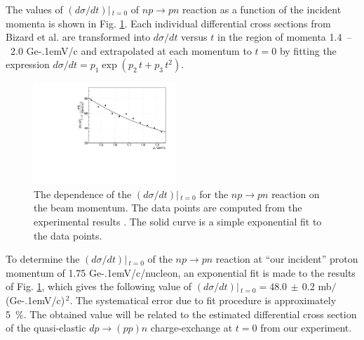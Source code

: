 \documentclass[twocolumn,epjc3]{svjour3}
\newcommand{\np}     {\ensuremath{np \rightarrow pn}\xspace}
\newcommand{\dpchex} {\ensuremath{dp \rightarrow (pp)n}\xspace}
\newcommand{\GeVc}   {Ge\kern-.1emV/c\xspace}
\begin{document}
The values of $(d\sigma/dt)|\,_{t=0}$ of \np reaction as a function of the
incident momenta is shown in Fig. \ref{fig:npsigma}. Each individual
differential cross sections from Bizard et al. \cite{biz75} are transformed into
$d\sigma/dt$ versus $t$ in the region of momenta 1.4~--~2.0 \GeVc and
extrapolated at each momentum to $t=0$ by fitting the expression
$d\sigma/dt = p_1\exp(p_2\,t + p_3\,t^2)$. %

\begin{figure}[ht]
  \centering
  \includegraphics[width=0.48\textwidth]{np_dSigma.pdf}
  \caption{The dependence of the $(d\sigma/dt)|\,_{t=0}$ for the \np reaction on
    the beam momentum. The data points are computed from the experimental
    results \cite{biz75}. The solid curve is a simple exponential fit to the
    data points.}
  \label{fig:npsigma}
\end{figure}

To determine the $(d\sigma/dt)|\,_{t=0}$ of the \np reaction at ``our incident''
proton momentum of 1.75 \GeVc/nucleon, an exponential fit is made to the results
of Fig. \ref{fig:npsigma}, which gives the following value of
$(d\sigma/dt)|\,_{t=0} = 48.0\,\pm\,0.2$ mb$/$(\GeVc)$^{\,2}$. The systematical
error due to fit procedure is approximately 5~\%. The obtained value will be
related to the estimated differential cross section of the quasi-elastic \dpchex
charge-exchange at $t=0$ from our experiment.
\end{document}
